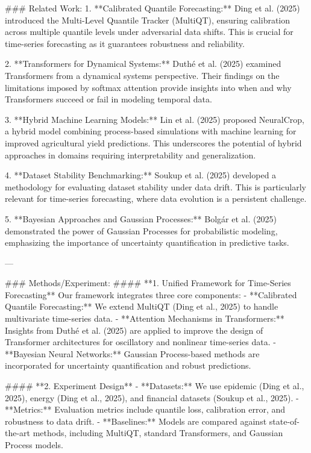 ### Related Work:
1. **Calibrated Quantile Forecasting:** Ding et al. (2025) introduced the Multi-Level Quantile Tracker (MultiQT), ensuring calibration across multiple quantile levels under adversarial data shifts. This is crucial for time-series forecasting as it guarantees robustness and reliability.

2. **Transformers for Dynamical Systems:** Duthé et al. (2025) examined Transformers from a dynamical systems perspective. Their findings on the limitations imposed by softmax attention provide insights into when and why Transformers succeed or fail in modeling temporal data.

3. **Hybrid Machine Learning Models:** Lin et al. (2025) proposed NeuralCrop, a hybrid model combining process-based simulations with machine learning for improved agricultural yield predictions. This underscores the potential of hybrid approaches in domains requiring interpretability and generalization.

4. **Dataset Stability Benchmarking:** Soukup et al. (2025) developed a methodology for evaluating dataset stability under data drift. This is particularly relevant for time-series forecasting, where data evolution is a persistent challenge.

5. **Bayesian Approaches and Gaussian Processes:** Bolgár et al. (2025) demonstrated the power of Gaussian Processes for probabilistic modeling, emphasizing the importance of uncertainty quantification in predictive tasks.

---

### Methods/Experiment:
#### **1. Unified Framework for Time-Series Forecasting**
Our framework integrates three core components:
   - **Calibrated Quantile Forecasting:** We extend MultiQT (Ding et al., 2025) to handle multivariate time-series data.
   - **Attention Mechanisms in Transformers:** Insights from Duthé et al. (2025) are applied to improve the design of Transformer architectures for oscillatory and nonlinear time-series data.
   - **Bayesian Neural Networks:** Gaussian Process-based methods are incorporated for uncertainty quantification and robust predictions.

#### **2. Experiment Design**
- **Datasets:** We use epidemic (Ding et al., 2025), energy (Ding et al., 2025), and financial datasets (Soukup et al., 2025).
- **Metrics:** Evaluation metrics include quantile loss, calibration error, and robustness to data drift.
- **Baselines:** Models are compared against state-of-the-art methods, including MultiQT, standard Transformers, and Gaussian Process models.

